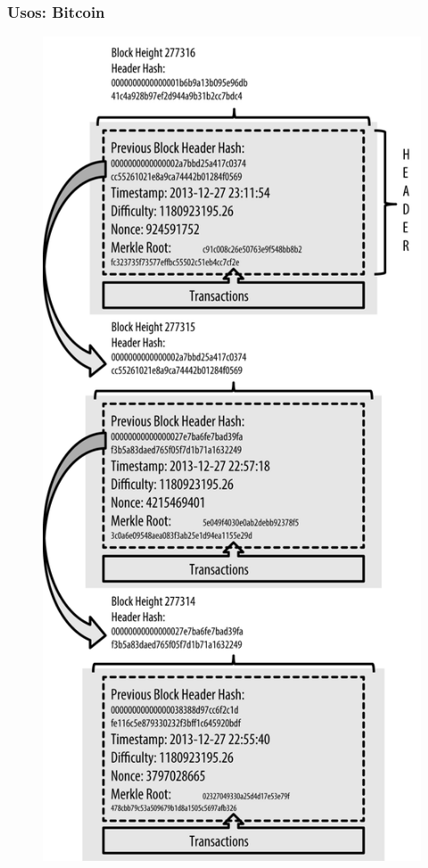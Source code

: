 \documentclass[10pt, a4paper,english,spanish]{beamer}
\begin{document}
\begin{frame}
\frametitle{Usos: Bitcoin}

\begin{figure}
\centering
  \includegraphics[width=.60\linewidth]{imagenes/blockchain.png}
\end{figure}

\end{frame}
\end{document}
